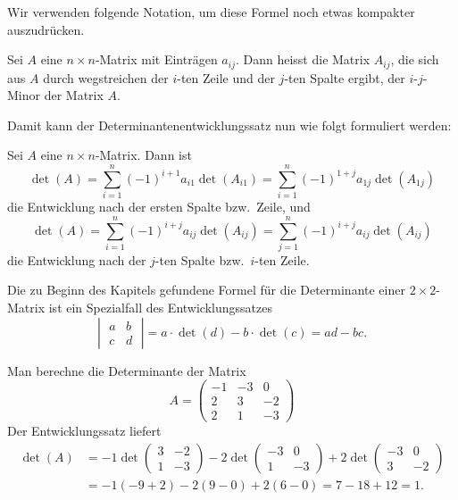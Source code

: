 Wir verwenden folgende Notation, um diese Formel noch etwas kompakter
auszudrücken.
\begin{definition}Sei $A$ eine $n\times n$-Matrix mit Einträgen $a_{ij}$.
Dann heisst die Matrix $A_{ij}$, die sich aus $A$ durch wegstreichen
der $i$-ten Zeile und der $j$-ten Spalte ergibt, der $i$-$j$-Minor der
Matrix $A$.
\end{definition}
Damit kann der Determinantenentwicklungssatz nun wie folgt formuliert
werden:
\begin{satz}
Sei $A$ eine $n\times n$-Matrix.
Dann ist
\[
\det(A)=
\sum_{i=1}^n(-1)^{i+1}a_{i1}\det(A_{i1})
=
\sum_{i=1}^n(-1)^{1+j}a_{1j}\det(A_{1j})
\]
die Entwicklung nach der ersten Spalte bzw.~Zeile, und 
\[
\det(A)=
\sum_{i=1}^n(-1)^{i+j}a_{ij}\det(A_{ij})
=
\sum_{j=1}^n(-1)^{i+j}a_{ij}\det(A_{ij})
\]
die Entwicklung nach der $j$-ten Spalte bzw.~$i$-ten Zeile. 
\end{satz}

\begin{beispiel}Die zu Beginn des Kapitels gefundene Formel für
die Determinante einer $2\times 2$-Matrix ist ein Spezialfall
des Entwicklungssatzes
\[
\left|\;
\begin{matrix}
a&b\\c&d
\end{matrix}
\;\right|
=a\cdot\det(d)-b\cdot\det(c)=ad-bc.
\]
\end{beispiel}

\begin{beispiel}
Man berechne die Determinante der Matrix
\[
A=\begin{pmatrix}
-1&-3&0\\
2&3&-2\\
2&1&-3
\end{pmatrix}
\]
Der Entwicklungssatz liefert
\begin{align*}
\det(A)&=
-1\det\begin{pmatrix}3&-2\\1&-3\end{pmatrix}
-2\det\begin{pmatrix}-3&0\\1&-3\end{pmatrix}
+2\det\begin{pmatrix}-3&0\\3&-2\end{pmatrix}
\\
&=
-1(-9+2)-2(9-0)+2(6-0)=7-18+12=1.
\end{align*}
\end{beispiel}

